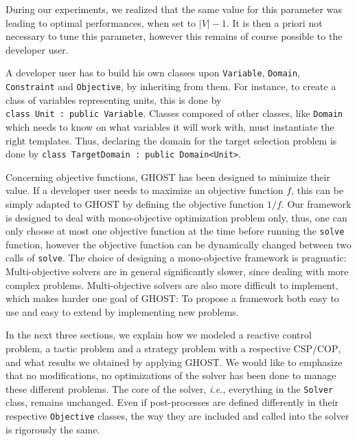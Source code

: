 \documentclass[journal]{IEEEtran}
\newcommand{\csp}{\textsc{CSP}\xspace}
\newcommand{\cop}{\textsc{COP}\xspace}
\newcommand{\ghost}{\textsc{GHOST}\xspace}
\newcommand{\ie}{\textit{i.e.}}
\begin{document}
During  our experiments,  we realized  that  the same  value for  this
parameter was  leading to optimal  performances, when set  to $|V|-1$.
It is then a priori not necessary to tune this parameter, however this
remains of course possible to the developer user.

A developer user has to  build his own classes upon \texttt{Variable},
\texttt{Domain},   \texttt{Constraint}   and  \texttt{Objective},   by
inheriting from  them. For  instance, to create  a class  of variables
representing        units,        this        is        done        by
\texttt{class~Unit~:~public~Variable}.   Classes   composed  of  other
classes, like \texttt{Domain} which needs to know on what variables it
will work with, must instantiate  the right templates. Thus, declaring
the   domain   for  the   target   selection   problem  is   done   by
\texttt{class~TargetDomain~:~public~Domain<Unit>}.

Concerning objective  functions, \ghost has been  designed to minimize
their  value.  If  a developer  user  needs to  maximize an  objective
function $f$,  this can be  simply adapted  to \ghost by  defining the
objective  function  $1/f$.   Our  framework is  designed  to  deal  with
mono-objective optimization problem only, thus, one can only choose at
most  one   objective  function  at   the  time  before   running  the
\texttt{solve}  function,  however  the   objective  function  can  be
dynamically changed between two calls of \texttt{solve}. The choice of
designing  a  mono-objective   framework  is  pragmatic:  Multi-objective
solvers are in  general significantly slower, since  dealing with more
complex problems.  Multi-objective solvers  are also more difficult to
implement, which makes harder one goal  of \ghost: To propose a framework
both easy to use and easy to extend by implementing new problems.

In  the next  three sections,  we explain  how we  modeled a  reactive
control  problem, a  tactic  problem  and a  strategy  problem with  a
respective \csp/\cop, and what results we obtained by applying \ghost.
We would like to emphasize that no modifications, no optimizations of the
solver has been  done to manage these different problems.  The core of
the  solver, \ie,  everything  in the  \texttt{Solver} class,  remains
unchanged.  Even  if post-processes  are defined differently  in their
respective \texttt{Objective}  classes, the way they  are included and
called into the solver is rigorously the same.
\end{document}
